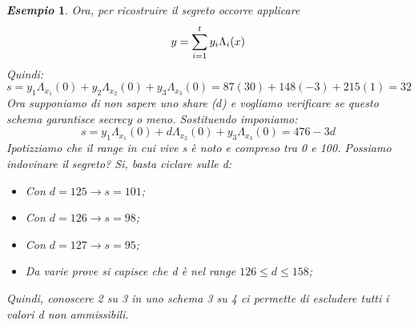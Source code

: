 \documentclass{book}
\newtheorem{esempio}{\emph{Esempio}}
\begin{document}
\begin{esempio}
    Ora, per ricostruire il segreto occorre applicare
    \begin{equation*}
        \centering
        y=\sum_{i=1}^{t}{y_{i}\Lambda_{i}(x)}
    \end{equation*}
    Quindi:
    \begin{equation*}
        s=y_{1}\Lambda_{x_{1}}(0)+y_{2}\Lambda_{x_{2}}(0)+y_{3}\Lambda_{x_{3}}(0)=87(30)+148(-3)+215(1)=32
    \end{equation*}
    Ora supponiamo di non sapere uno share \emph(\(d\)) e vogliamo verificare se questo schema garantisce secrecy o meno\@. Sostituendo imponiamo:
    \begin{equation*}
        s=y_{1}\Lambda_{x_{1}}(0)+d\Lambda_{x_{2}}(0)+y_{3}\Lambda_{x_{3}}(0)= 476-3d
    \end{equation*}
    Ipotizziamo che il range in cui vive s è noto e compreso tra 0 e 100\@. Possiamo indovinare il segreto? Si, basta ciclare sulle d:\begin{itemize}
        \item Con \(d=125\rightarrow s=101\);
        \item Con \(d=126\rightarrow s=98\);
        \item Con \(d=127\rightarrow s=95\);
        \item Da varie prove si capisce che d è nel range \(126\leq d\leq 158\);
    \end{itemize}
    Quindi, conoscere 2 su 3 in uno schema 3 su 4 ci permette di escludere tutti i valori d non ammissibili\@.
\end{esempio}
\end{document}
